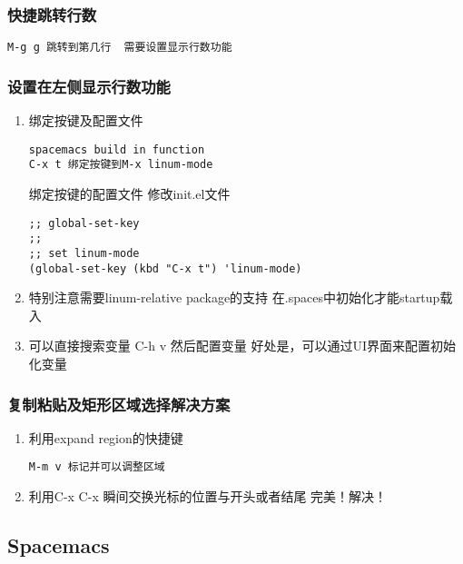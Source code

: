 \documentclass[11pt]{article}
\begin{document}
\subsubsection{快捷跳转行数}
\label{sec:orgd5bfdfe}
\begin{verbatim}
M-g g 跳转到第几行  需要设置显示行数功能
\end{verbatim}
\subsubsection{设置在左侧显示行数功能}
\label{sec:org92d0b6b}
\begin{enumerate}
\item 绑定按键及配置文件
\label{sec:org767cee0}
\begin{verbatim}
spacemacs build in function
C-x t 绑定按键到M-x linum-mode
\end{verbatim}
绑定按键的配置文件 修改init.el文件
\begin{verbatim}
;; global-set-key
;;
;; set linum-mode
(global-set-key (kbd "C-x t") 'linum-mode)
\end{verbatim}
\item 特别注意需要linum-relative package的支持
\label{sec:orgf0219d5}
在.spaces中初始化才能startup载入
\item 可以直接搜索变量 C-h v 然后配置变量
\label{sec:org67cefcc}
好处是，可以通过UI界面来配置初始化变量
\end{enumerate}
\subsubsection{复制粘贴及矩形区域选择解决方案}
\label{sec:orgdee75c2}
\begin{enumerate}
\item 利用expand region的快捷键
\label{sec:org751d06d}
\begin{verbatim}
M-m v 标记并可以调整区域
\end{verbatim}
\item 利用C-x C-x 瞬间交换光标的位置与开头或者结尾
\label{sec:orgbeddc1d}
完美！解决！
\end{enumerate}
\subsection{Spacemacs}
\label{sec:org308782f}
\end{document}
